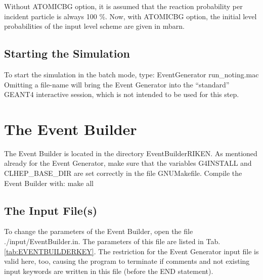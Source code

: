 \documentclass[12pt]{book}
\begin{document}
Without ATOMICBG option, it is assumed that the reaction probability per incident
particle is always 100 \%. Now, with ATOMICBG option, the initial level probabilities
of the input level scheme are given in mbarn.

\section{Starting the Simulation}
To start the simulation in the batch mode, type:\hfill{}
\linebreak \linebreak
{\ttfamily
EventGenerator run\_noting.mac
}
\linebreak \linebreak
Omitting a file-name will bring the Event Generator into the ``standard'' GEANT4 interactive session, which is not 
intended to be used for this step.

\chapter{The Event Builder}

The Event Builder is located in the directory {\ttfamily EventBuilderRIKEN}. As mentioned already for the 
Event Generator, make sure that the variables {\ttfamily G4INSTALL}
and {\ttfamily CLHEP\_BASE\_DIR} are set correctly in the file {\ttfamily GNUMakefile}.
Compile the Event Builder with:\hfill{}
\linebreak
\linebreak
{\ttfamily make all}
\linebreak
\linebreak

\section{The Input File(s)}

To change the parameters of the Event Builder, open the file 
{\ttfamily ./input/EventBuilder.in}. The 
parameters of this file are listed in Tab.\ref{tab:EVENTBUILDERKEY}.
The restriction for the Event Generator input file is valid here, too, causing 
the program to terminate if 
comments and not existing input keywords are written in this file (before the END statement).
\end{document}
